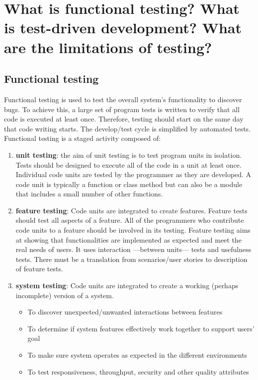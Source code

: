 \section{What is functional testing? What is test-driven development? What are the limitations of testing?}
\subsection{Functional testing}
Functional testing is used to test the overall system's functionality to discover bugs. To achieve this, a large set of program tests is written to verify that all code is executed at least once. Therefore, testing should start on the same day that code writing starts. The develop/test cycle is simplified by automated tests. Functional testing is a staged activity composed of:
\begin{enumerate}
   \item \textbf{unit testing}: the aim of unit testing is to test program units in isolation. Tests should be designed to execute all of the code in a unit at least once. Individual code units are tested by the programmer as they are developed. A code unit is typically a function or class method but can also be a module that includes a small number of other functions.
   \item \textbf{feature testing}:
         Code units are integrated to create features. Feature tests should test all aspects of a feature. All of the programmers who contribute code units to a feature should be involved in its testing. Feature testing aims at showing that functionalities are implemented as expected and meet the real needs of users. It uses interaction {---}between units{---} tests and usefulness tests. There must be a translation from scenarios/user stories to description of feature tests.
   \item \textbf{system testing}: Code units are integrated to create a working (perhaps incomplete) version of a system.
         \begin{itemize}
            \item To discover unexpected/unwanted interactions between features
            \item To determine if system features effectively work together to support users' goal
            \item To make sure system operates as expected in the different environments
            \item To test responsiveness, throughput, security and other quality attributes

\end{itemize}
\end{enumerate}
